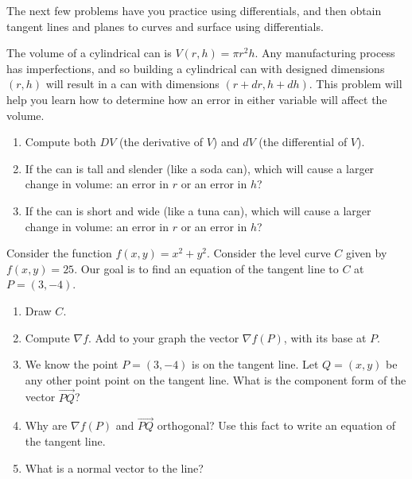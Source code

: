 The next few problems have you practice using differentials, and then obtain tangent lines and planes to curves and surface using differentials.

\begin{problem}
The volume of a cylindrical can is $V(r,h)=\pi r^2 h$. Any manufacturing process has imperfections, and so building a cylindrical can with designed dimensions $(r,h)$ will result in a can with dimensions $(r+dr,h+dh)$. This problem will help you learn how to determine how an error in either variable will affect the volume.
\begin{enumerate}
 \item Compute both $DV$ (the derivative of $V$) and $dV$ (the differential of $V$).
 \item If the can is tall and slender (like a soda can), which will cause a larger change in volume: an error in $r$ or an error in $h$?
 \item If the can is short and wide (like a tuna can), which will cause a larger change in volume: an error in $r$ or an error in $h$?

\end{enumerate}
\end{problem}

\begin{problem}
 Consider the function $f(x,y)=x^2+y^2$.  Consider the level curve $C$ given by $f(x,y)=25$. Our goal is to find an equation of the tangent line to $C$ at $P=(3,-4)$.
 \begin{enumerate}
  \item Draw $C$.
  \item Compute $\nabla f$. Add to your graph the vector $\nabla f(P)$, with its base at $P$. 
  \item We know the point $P=(3,-4)$ is on the tangent line. Let $Q=(x,y)$ be any other point point on the tangent line.  What is the component form of the vector $\vec {PQ}$?
  \item Why are  $\nabla f(P)$ and $\vec{PQ}$ orthogonal? Use this fact to write an equation of the tangent line.
  \item What is a normal vector to the line?
 \end{enumerate}

\end{problem}

